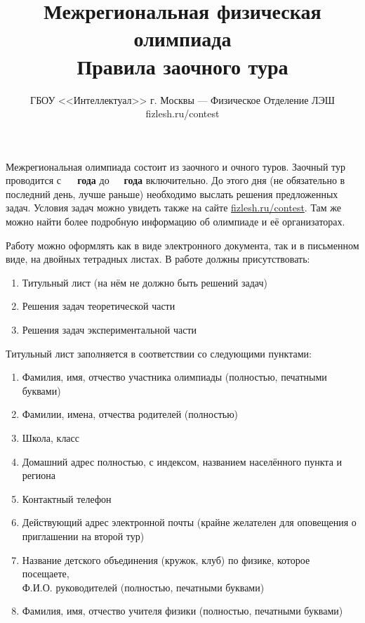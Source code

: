 \documentclass[a4paper,12pt]{article}
\title{\bf Межрегиональная физическая олимпиада\\Правила заочного тура}
\author{ГБОУ <<Интеллектуал>> г. Москвы --- Физическое Отделение ЛЭШ\\
fizlesh.ru/contest}
\begin{document}
\maketitle
\thispagestyle{empty}

Межрегиональная олимпиада состоит из заочного и очного туров. Заочный тур проводится
с~\textbf{\olympdatestart~\olympyearstart~года} до \textbf{\olympdateend~\olympyearend~года} включительно.
До этого дня (не обязательно в последний день, лучше раньше) необходимо выслать решения предложенных задач.
Условия задач можно увидеть также на сайте \href{http://fizlesh.ru/contest}{fizlesh.ru/contest}.
Там же можно найти более подробную информацию об олимпиаде и её организаторах.

\bigskip

Работу можно оформлять как в виде электронного документа, так и в письменном виде, на двойных тетрадных листах.
В работе должны присутствовать:
\begin{enumerate}
\setlength{\itemsep}{-3pt}
\item Титульный лист (на нём не должно быть решений задач)
\item Решения задач теоретической части
\item Решения задач экспериментальной части
\end{enumerate}

Титульный лист заполняется в соответствии со следующими пунктами:
\begin{enumerate}
\setlength{\itemsep}{-3pt}
\item Фамилия, имя, отчество участника олимпиады (полностью, печатными буквами)
\item Фамилии, имена, отчества родителей (полностью)
\item Школа, класс
\item Домашний адрес полностью, с индексом, названием населённого пункта и региона
\item Контактный телефон
\item Действующий адрес электронной почты (крайне желателен для оповещения о приглашении на второй тур)
\item Название детского объединения (кружок, клуб) по физике, которое посещаете,\\
Ф.И.О. руководителей (полностью, печатными буквами)
\item Фамилия, имя, отчество учителя физики (полностью, печатными буквами)
\end{enumerate}


\bigskip
\end{document}
